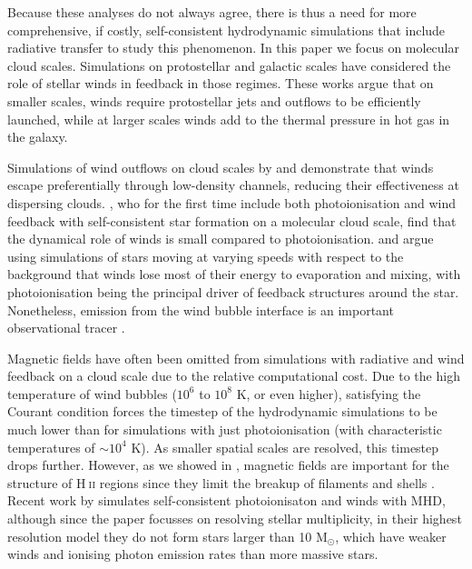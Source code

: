 \documentclass[a4paper,fleqn,usenatbib]{mnras}
\newcommand{\Msolar}{M$_{\odot}$\xspace}
\newcommand{\HII}{H$~$\textsc{ii}\xspace}
\begin{document}
Because these analyses do not always agree, there is thus a need for more comprehensive, if costly, self-consistent hydrodynamic simulations that include radiative transfer to study this phenomenon. In this paper we focus on molecular cloud scales. Simulations on protostellar \citep[e.g.][]{Kuiper2018} \ISM \citep[e.g][]{Gatto2017} and galactic \citep[e.g.][]{Agertz2013} scales have considered the role of stellar winds in feedback in those regimes. These works argue that on smaller scales, winds require protostellar jets and outflows to be efficiently launched, while at larger scales winds add to the thermal pressure in hot gas in the galaxy. 

Simulations of wind outflows on cloud scales by \cite{Rogers2013} and \cite{Rey-Raposo2017} demonstrate that winds escape preferentially through low-density channels, reducing their effectiveness at dispersing clouds. \cite{Dale2014}, who for the first time include both photoionisation and wind feedback with self-consistent star formation on a molecular cloud scale, find that the dynamical role of winds is small compared to photoionisation. \cite{Mackey2013} and \cite{Mackey2015} argue using simulations of stars moving at varying speeds with respect to the background that winds lose most of their energy to evaporation and mixing, with photoionisation being the principal driver of feedback structures around the star. Nonetheless, emission from the wind bubble interface is an important observational tracer \citep{Green2019}.

Magnetic fields have often been omitted from simulations with radiative and wind feedback on a cloud scale due to the relative computational cost. Due to the high temperature of wind bubbles ($10^6$ to $10^8$ K, or even higher), satisfying the Courant condition forces the timestep of the hydrodynamic simulations to be much lower than for simulations with just photoionisation (with characteristic temperatures of $\sim10^4$ K). As smaller spatial scales are resolved, this timestep drops further. However, as we showed in \cite{Geen2015b}, magnetic fields are important for the structure of \HII regions since they limit the breakup of filaments and shells \citep[see also][]{Hennebelle2013}. Recent work by \cite{Wall2019} simulates self-consistent photoionisaton and winds with MHD, although since the paper focusses on resolving stellar multiplicity, in their highest resolution model they do not form stars larger than 10 \Msolar, which have weaker winds and ionising photon emission rates than more massive stars.
\end{document}
